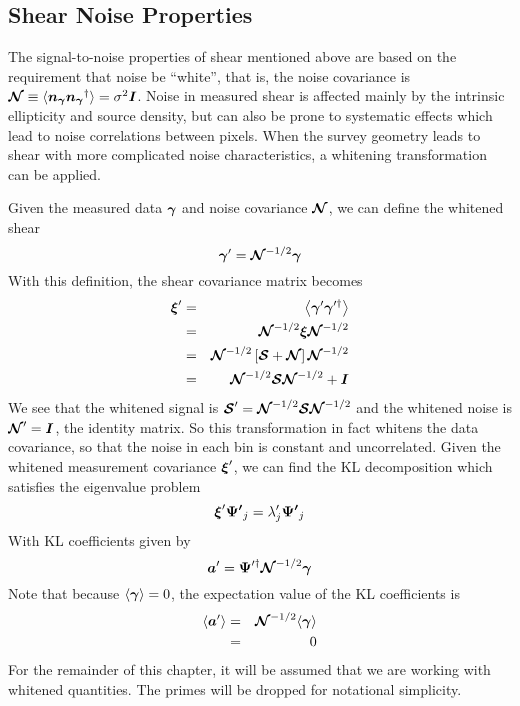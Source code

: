 \subsection{Shear Noise Properties}
\label{sec:whitening}
The signal-to-noise properties of shear mentioned above are based on the 
requirement that noise be ``white'', that is, the noise covariance is
$\boldsymbol{\mathcal{N}} \equiv 
\langle\boldsymbol{n_\gamma}\boldsymbol{n_\gamma}^\dagger\rangle
= \sigma^2 \boldsymbol{I}$.  Noise in measured shear is affected mainly by the
intrinsic ellipticity and source density, but can also be prone to systematic
effects which lead to noise correlations between pixels.  When the survey
geometry leads to shear with more complicated noise characteristics, a
whitening transformation can be applied.

Given the measured data $\boldsymbol{\gamma}$ and noise covariance
$\boldsymbol{\mathcal{N}}$, we can define the whitened shear
\begin{equation}
  \boldsymbol{\gamma}^\prime = \boldsymbol{\mathcal{N}}^{-1/2} \boldsymbol{\gamma}
\end{equation}
With this definition, the shear covariance matrix becomes
\begin{eqnarray}
  \boldsymbol{\xi}^\prime 
  &=& \left\langle \boldsymbol{\gamma}^\prime 
  \boldsymbol{\gamma}^{\prime\dagger}\right\rangle \nonumber\\
  &=& \boldsymbol{\mathcal{N}}^{-1/2}\boldsymbol{\xi}
  \boldsymbol{\mathcal{N}}^{-1/2} \nonumber\\
  &=& \boldsymbol{\mathcal{N}}^{-1/2}\left[
    \boldsymbol{\mathcal{S}} + \boldsymbol{\mathcal{N}}
    \right]\boldsymbol{\mathcal{N}}^{-1/2} \nonumber\\
  &=& \boldsymbol{\mathcal{N}}^{-1/2}\boldsymbol{\mathcal{S}}\boldsymbol{\mathcal{N}}^{-1/2} + \boldsymbol{I}
\end{eqnarray}
We see that the whitened signal is $\boldsymbol{\mathcal{S}}^\prime = 
\boldsymbol{\mathcal{N}}^{-1/2}\boldsymbol{\mathcal{S}}\boldsymbol{\mathcal{N}}^{-1/2}$
and the whitened noise is $\boldsymbol{\mathcal{N}}^\prime = \boldsymbol{I}$, the
identity matrix. So this transformation in fact whitens the data covariance,
so that the noise in each bin is constant and uncorrelated.  Given the
whitened measurement covariance $\boldsymbol{\xi}^\prime$, we can find the KL
decomposition which satisfies the eigenvalue problem
\begin{equation}
  \boldsymbol{\xi}^\prime \boldsymbol{\Psi^\prime}_j = 
  \lambda^\prime_j \boldsymbol{\Psi^\prime}_j
\end{equation}
With KL coefficients given by
\begin{equation}
  \boldsymbol{a}^\prime = \boldsymbol{\Psi}^{\prime\dagger}
  \boldsymbol{\mathcal{N}}^{-1/2}\boldsymbol{\gamma}
\end{equation}
Note that because $\langle\boldsymbol{\gamma}\rangle = 0$,
the expectation value of the KL coefficients is
\begin{eqnarray}
  \langle\boldsymbol{a}^\prime\rangle 
  &=& \boldsymbol{\mathcal{N}}^{-1/2}\langle\boldsymbol{\gamma}\rangle\nonumber\\
  &=& 0
\end{eqnarray}
For the remainder of this chapter, it will be assumed that we are working with
whitened quantities.  The primes will be dropped for notational simplicity.

